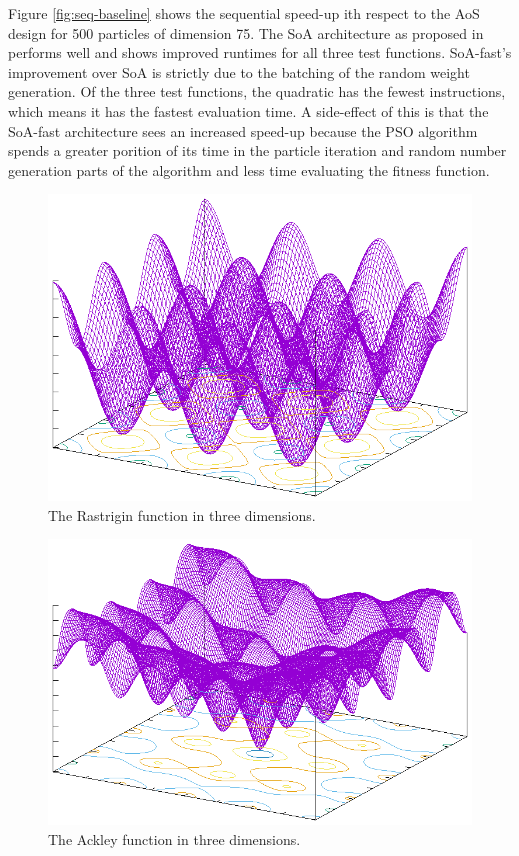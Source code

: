 Figure \ref{fig:seq-baseline} shows the sequential speed-up ith respect to the
AoS design for 500 particles of dimension 75. The SoA architecture as proposed
in \cite{cache-pso} performs well and shows improved runtimes for all three test
functions. SoA-fast's improvement over SoA is strictly due to the
batching of the random weight generation. Of the three test functions, the
quadratic has the fewest instructions, which means it has the fastest evaluation
time. A side-effect of this is that the SoA-fast architecture sees an
increased speed-up because the PSO algorithm spends a greater porition of its
time in the particle iteration and random number generation parts of the
algorithm and less time evaluating the fitness function.



\begin{figure}
  \includegraphics[width=\columnwidth]{../img/output/rastrigin}
  \caption{The Rastrigin function in three dimensions.}\label{fig:rastrigin}
\end{figure}

\begin{figure}
  \includegraphics[width=\columnwidth]{../img/output/ackley}
  \caption{The Ackley function in three dimensions.}\label{fig:ackley}
\end{figure}

